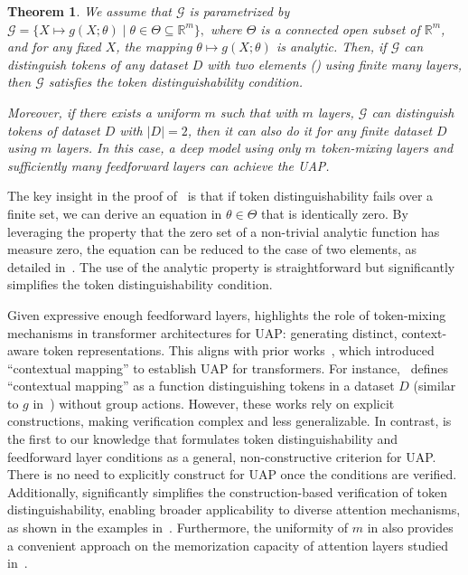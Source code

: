 \documentclass{article}
\newtheorem{theorem}{Theorem}
\newcommand{\ql}[1]{{\footnotesize\textcolor{red}{QL: #1}}}
\begin{document}
\begin{theorem}
    \label{prop:analytic}
    We assume that $\mathcal{G}$ is parametrized by $
        \mathcal{G}=\{X\mapsto g(X; \theta) \mid \theta\in\Theta\subseteq \mathbb{R}^m\},$ where $\Theta$ is a connected open subset of $\mathbb{R}^m$, and for any fixed $X$, the mapping $\theta\mapsto g(X;\theta)$ is analytic. 
        Then, if $\mathcal{G}$ can distinguish tokens of any dataset $D$ with two elements () using finite many layers,
        then $\mathcal G$ satisfies the token distinguishability condition. 

    Moreover, if there exists a uniform $m$ such that with $m$ layers, $\mathcal G$ can distinguish tokens of dataset $D$ with $|D|=2$, then it can also do it for any finite dataset $D$ using $m$ layers.
    In this case, a deep model using only $m$ token-mixing layers and sufficiently many feedforward layers can achieve the UAP.
\end{theorem}

The key insight in the proof of~ is that if token distinguishability fails over a finite set, we can derive an equation in $\theta \in \Theta$ that is identically zero. By leveraging the property that the zero set of a non-trivial analytic function has measure zero, the equation can be reduced to the case of two elements, as detailed in~. The use of the analytic property is straightforward but significantly simplifies the token distinguishability condition. 

Given expressive enough feedforward layers,  highlights the role of token-mixing mechanisms in transformer architectures for UAP: generating distinct, context-aware token representations. This aligns with prior works~\cite{zaheer2020big,yun2020n,kajitsukatransformers}, which introduced ``contextual mapping'' to establish UAP for transformers. For instance,~\cite{kajitsukatransformers} defines ``contextual mapping'' as a function distinguishing tokens in a dataset $D$ (similar to $g$ in~) without group actions. However, these works rely on explicit constructions, making verification complex and less generalizable. 
In contrast,  is the first to our knowledge that formulates token distinguishability and feedforward layer conditions as a general, non-constructive criterion for UAP. 
There is no need to explicitly construct for UAP once the conditions are verified. 
Additionally,  significantly simplifies the construction-based verification of token distinguishability, enabling broader applicability to diverse attention mechanisms, as shown in the examples in~. 
Furthermore, the uniformity of $m$ in  also provides a convenient approach on the memorization capacity of attention layers studied in~\cite{kajitsukatransformers}.
\end{document}
